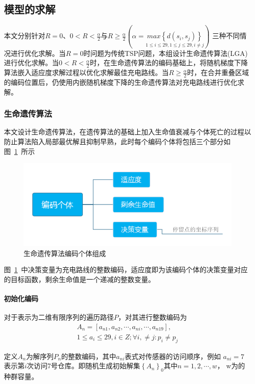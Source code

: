 \documentclass{whutmod}
\begin{document}
		\subsection{模型的求解}
		本文分别针对$R=0$、$0<R<\frac{\alpha }{2}$与$R\geqslant\frac{\alpha }{2} (\alpha =\underset{1\leqslant i\leqslant 29,1\leqslant j\leqslant 29,i\neq j}{max\left \{ d(s_i,s_j) \right \}}) $
		三种不同情况进行优化求解。当$R=0$时问题为传统TSP问题，本组设计生命遗传算法(LGA)进行优化求解。当$0<R<\frac{\alpha }{2}$时，在生命遗传算法的编码基础上，将随机梯度下降算法嵌入适应度求解过程以优化求解最佳充电路线。当$R\geqslant\frac{\alpha }{2}$时，在合并重叠区域的编码位置后，仍使用内嵌随机梯度下降的生命遗传算法对充电路线进行优化求解。
		
		\subsubsection{生命遗传算法}
		本文设计生命遗传算法，在遗传算法的基础上加入生命值衰减与个体死亡的过程以防止算法陷入局部最优解且抑制早熟，此时每个编码个体将包括三个部分如图~\ref{saf}~所示
		\begin{figure}[H]
			\centering
			\includegraphics[width=.8\textwidth]{figures/lga.png}
			\caption{生命遗传算法编码个体组成}\label{saf}
		\end{figure}
		
		图~\ref{saf}~中决策变量为充电路线的整数编码，适应度即为该编码个体的决策变量对应的目标函数，剩余生命值是一个递减的整数变量。
		 \paragraph{初始化编码}
		对于表示为二维有限序列的遍历路径$P$，对其进行整数编码为
		\begin{gather*}
		A_n=[a_{n1},a_{n2},\cdots,a_{ni},\cdots,a_{n19}], \\
		1\leqslant a_i \leqslant 29 ,i\in Z ;\forall i, \neq j:p_i \neq p_j 
		\end{gather*}
		
		定义$A_n$为解序列$P_{n}$的整数编码，其中$a_{ni}$表式对传感器的访问顺序，例如 $a_{ni}=7$表示第$i$次访问7号仓库。即随机生成初始解集$\left \{A_n\right \}_0$其中$n=1,2,\cdots,w$， w为的种群容量。
		
\end{document}

